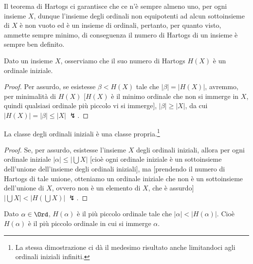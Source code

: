 \documentclass[11pt]{scrartcl}
\begin{document}
\begin{remark}
	Il teorema di Hartogs ci garantisce che ce n'è sempre almeno uno, per ogni insieme $X$, dunque l'insieme degli ordinali non equipotenti ad alcun sottoinsieme di $X$ è non vuoto ed è un insieme di ordinali, pertanto, per quanto visto, ammette sempre minimo, di conseguenza
il numero di Hartogs di un insieme è sempre ben definito.
\end{remark}

\begin{remark}[$H(X)$ iniziale]
	Dato un insieme $X$, osserviamo che il suo numero di Hartogs $H(X)$ è un ordinale iniziale.
\end{remark}

\begin{proof}
	Per assurdo, se esistesse $\beta < H(X)$ tale che $|\beta| = |H(X)|$, avremmo, per minimalità di $H(X)$ [$H(X)$ è il minimo ordinale che non si immerge in $X$, quindi qualsiasi ordinale più piccolo vi si immerge], $|\beta| \geq |X|$, da
	cui $|H(X)| = |\beta| \leq |X| \; \lightning$.
\end{proof}

\begin{corollary}
	La classe degli ordinali iniziali è una classe propria.\footnote{La stessa dimostrazione ci dà il medesimo risultato anche limitandoci agli ordinali iniziali infiniti.}
\end{corollary}

\begin{proof}
	Se, per assurdo, esistesse l'insieme $X$ degli ordinali iniziali, allora per ogni ordinale iniziale $|\alpha| \leq \left\lvert \bigcup X\right\rvert$
	[cioè ogni ordinale iniziale è un sottoinsieme dell'unione dell'insieme degli ordinali iniziali], ma [prendendo il numero di Hartogs di tale unione, otteniamo un ordinale iniziale che non è un sottoinsieme dell'unione di $X$,
	ovvero non è un elemento di $X$, che è assurdo] $\left\lvert \bigcup X\right\rvert < \left\lvert H \left(\bigcup X\right)\right\rvert \; \lightning$.
\end{proof}

\begin{remark}
	Dato $\alpha \in \Ord$, $H(\alpha)$ è il più piccolo ordinale tale che $|\alpha| < |H(\alpha)|$.
	Cioè $H(\alpha)$ è il più piccolo ordinale in cui si immerge $\alpha$.
\end{remark}
\end{document}
